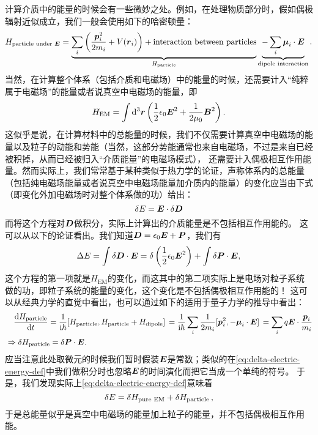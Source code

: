 计算介质中的能量的时候会有一些微妙之处。例如，在处理物质部分时，假如偶极辐射近似成立，我们一般会使用如下的哈密顿量：
\begin{equation}
    H_{\text{particle under $\vb*{E}$}} = \underbrace{
        \sum_{i} \left(
            \frac{\vb*{p}_i^2}{2m_i} + V(\vb*{r}_i)
        \right) + \text{interaction between particles}
    }_{H_{\text{particle}}}
    \underbrace{
        - \sum_i \vb*{\mu}_i \cdot \vb*{E}
    }_{\text{dipole interaction}}.
\end{equation}
当然，在计算整个体系（包括介质和电磁场）中的能量的时候，还需要计入“纯粹属于电磁场”的能量或者说真空中电磁场的能量，即
\begin{equation}
    H_{\text{EM}} = \int \dd[3]{\vb*{r}} \left(
        \frac{1}{2} \epsilon_0 \vb*{E}^2 
        + \frac{1}{2 \mu_0} \vb*{B}^2
    \right).
\end{equation}
这似乎是说，在计算材料中的总能量的时候，我们不仅需要计算真空中电磁场的能量以及粒子的动能和势能（当然，这部分势能通常也来自电磁场，不过是来自已经被积掉，从而已经被归入“介质能量”的电磁场模式），
还需要计入偶极相互作用能量。然而实际上，我们常常基于某种类似于热力学的论证，声称体系内的总能量（包括纯电磁场能量或者说真空中电磁场能量加介质内的能量）的变化应当由下式（即变化外加电磁场时对整个体系做的功）给出：
\begin{equation}
    \var{E} = \vb*{E} \cdot \var{\vb*{D}}
\end{equation}
而将这个方程对$\vb*{D}$做积分，实际上计算出的介质能量是不包括相互作用能的。
这可以从以下的论证看出。我们知道$\vb*{D} = \epsilon_0 \vb*{E} + \vb*{P}$，我们有
\begin{equation}
    \Delta E = \int \var{\vb*{D}} \cdot \vb*{E} = \var \left(\frac{1}{2} \epsilon_0 \vb*{E}^2\right) 
    + \int \var{\vb*{P}} \cdot \vb*{E} ,
    \label{eq:delta-electric-energy-def}
\end{equation}
这个方程的第一项就是$H_{\text{EM}}$的变化，而这其中的第二项实际上是电场对粒子系统做的功，即粒子系统的能量的变化，这个变化是不包括偶极相互作用能的！
这可以从经典力学的直觉中看出，也可以通过如下的适用于量子力学的推导中看出：
\begin{equation}
    \begin{aligned}
        &\quad \dv{H_{\text{particle}}}{t} = \frac{1}{\ii \hbar} \comm*{H_{\text{particle}}}{H_{\text{particle}} + H_{\text{dipole}}}
        = \frac{1}{\ii \hbar} \sum_i \frac{1}{2 m_i} \comm*{\vb*{p}_i^2}{- \vb*{\mu}_i \cdot \vb*{E}}
        = \sum_i q \vb*{E} \cdot \frac{\vb*{p}_i}{m_i} \\
        &\Rightarrow \var{H_{\text{particle}}} = \var{\vb*{P}} \cdot \vb*{E}.
    \end{aligned}
\end{equation}
应当注意此处取微元的时候我们暂时假装$\vb*{E}$是常数；类似的在\eqref{eq:delta-electric-energy-def}中我们做积分时也忽略$\vb*{E}$的时间演化而把它当成一个单纯的符号。
于是，我们发现实际上\eqref{eq:delta-electric-energy-def}意味着
\begin{equation}
    \var{E} = \var{H_{\text{pure EM}}} + \var{H_{\text{particle}}},
\end{equation}
于是总能量似乎是真空中电磁场的能量加上粒子的能量，并不包括偶极相互作用能。


